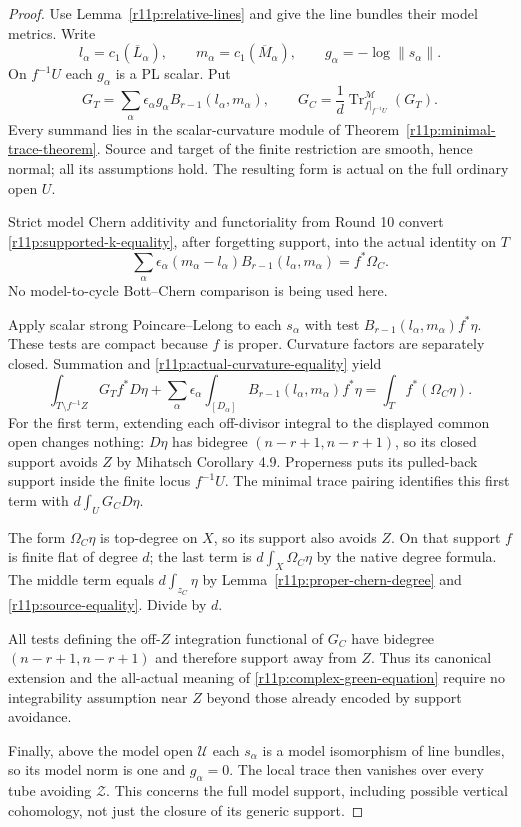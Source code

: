 \begin{proof}
Use Lemma~\ref{r11p:relative-lines} and give the line bundles their
model metrics.  Write
\[
 l_\alpha=c_1(\overline L_\alpha),\qquad
 m_\alpha=c_1(\overline M_\alpha),\qquad
 g_\alpha=-\log\|s_\alpha\|.
\]
On $f^{-1}U$ each $g_\alpha$ is a PL scalar.  Put
\[
       G_T=\sum_\alpha\epsilon_\alpha
                    g_\alpha B_{r-1}(l_\alpha,m_\alpha),
       \qquad
       G_C=\frac1d\operatorname{Tr}^{\mathscr M}_{f|_{f^{-1}U}}(G_T).
\tag{PC8}\label{r11p:complex-green-formula}
\]
Every summand lies in the scalar-curvature module of
Theorem~\ref{r11p:minimal-trace-theorem}.  Source and target of the
finite restriction are smooth, hence normal; all its assumptions hold.
The resulting form is actual on the full ordinary open $U$.

Strict model Chern additivity and functoriality from Round 10 convert
\eqref{r11p:supported-k-equality}, after forgetting support, into
the actual identity on $T$
\[
 \sum_\alpha\epsilon_\alpha
             (m_\alpha-l_\alpha)B_{r-1}(l_\alpha,m_\alpha)
                                      =f^*\Omega_C.
\tag{PC9}\label{r11p:actual-curvature-equality}
\]
No model-to-cycle Bott--Chern comparison is being used here.

Apply scalar strong Poincare--Lelong to each $s_\alpha$ with test
$B_{r-1}(l_\alpha,m_\alpha)f^*\eta$.  These tests are compact because
$f$ is proper.  Curvature factors are separately closed.  Summation
and \eqref{r11p:actual-curvature-equality} yield
\[
 \int_{T\setminus f^{-1}Z}G_Tf^*D\eta
 +\sum_\alpha\epsilon_\alpha
       \int_{[D_\alpha]}B_{r-1}(l_\alpha,m_\alpha)f^*\eta
                         =\int_Tf^*(\Omega_C\eta).
\tag{PC10}\label{r11p:upstairs-complex-PL}
\]
For the first term, extending each off-divisor integral to the
displayed common open changes nothing: $D\eta$ has bidegree
$(n-r+1,n-r+1)$, so its closed support avoids $Z$ by
Mihatsch Corollary 4.9.  Properness puts its pulled-back support
inside the finite locus $f^{-1}U$.  The minimal trace pairing identifies
this first term with $d\int_UG_CD\eta$.

The form $\Omega_C\eta$ is top-degree on $X$, so its support also
avoids $Z$.  On that support $f$ is finite flat of degree $d$;
the last term is $d\int_X\Omega_C\eta$ by the native degree formula.
The middle term equals $d\int_{z_C}\eta$ by
Lemma~\ref{r11p:proper-chern-degree} and
\eqref{r11p:source-equality}.  Divide by $d$.

All tests defining the off-$Z$ integration functional of $G_C$
have bidegree $(n-r+1,n-r+1)$ and therefore support away from $Z$.
Thus its canonical extension and the all-actual meaning of
\eqref{r11p:complex-green-equation} require no integrability
assumption near $Z$ beyond those already encoded by support avoidance.

Finally, above the model open $\mathcal U$ each $s_\alpha$ is a model
isomorphism of line bundles, so its model norm is one and $g_\alpha=0$.
The local trace then vanishes over every tube avoiding $\mathcal Z$.
This concerns the full model support, including possible vertical
cohomology, not just the closure of its generic support.
\end{proof}

